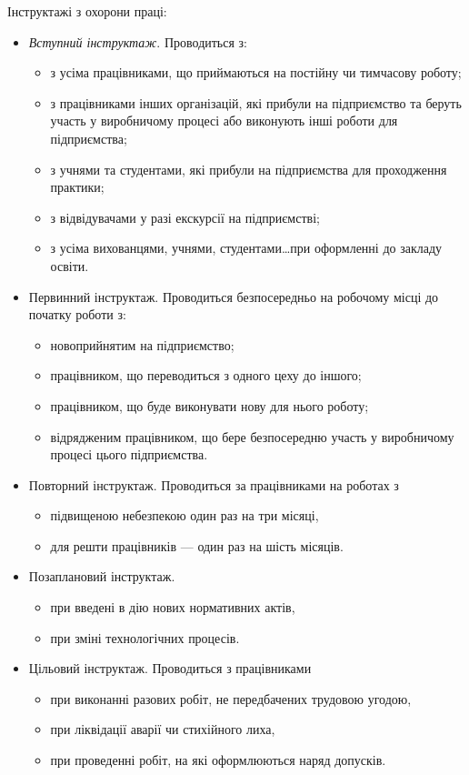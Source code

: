 \documentclass[a5paper,10pt,notitlepage,pdftex,headsepline]{scrartcl}
\begin{document}
  Інструктажі з охорони праці:
  \begin{itemize}
    \item \emph{Вступний інструктаж}.
      Проводиться з:
      \begin{itemize}
        \item з усіма працівниками, що приймаються на постійну чи тимчасову
          роботу;
        \item з працівниками інших організацій, які прибули на підприємство та
          беруть участь у виробничому процесі або виконують інші роботи для
          підприємства;
        \item з учнями та студентами, які прибули на підприємства для
          проходження практики;
        \item з відвідувачами у разі екскурсії на підприємстві;
        \item з усіма вихованцями, учнями, студентами\ldots при оформленні до
          закладу освіти.
      \end{itemize}
    \item Первинний інструктаж.
      Проводиться безпосередньо на робочому місці до початку роботи з:
      \begin{itemize}
        \item новоприйнятим на підприємство;
        \item працівником, що переводиться з одного цеху до іншого;
        \item працівником, що буде виконувати нову для нього роботу;
        \item відрядженим працівником, що бере безпосередню участь у
          виробничому процесі цього підприємства.
      \end{itemize}
    \item Повторний інструктаж.
      Проводиться за працівниками на роботах з
      \begin{itemize}
        \item підвищеною небезпекою один раз на три місяці,
        \item для решти працівників --- один раз на шість місяців.
      \end{itemize}
    \item Позаплановий інструктаж.
      \begin{itemize}
        \item при введені в дію нових нормативних актів,
        \item при зміні технологічних процесів.
      \end{itemize}
    \item Цільовий інструктаж.
      Проводиться з працівниками
      \begin{itemize}
        \item при виконанні разових робіт, не передбачених трудовою угодою,
        \item при ліквідації аварії чи стихійного лиха,
        \item при проведенні робіт, на які оформлюються наряд допусків.
      \end{itemize}
  \end{itemize}
\end{document}
